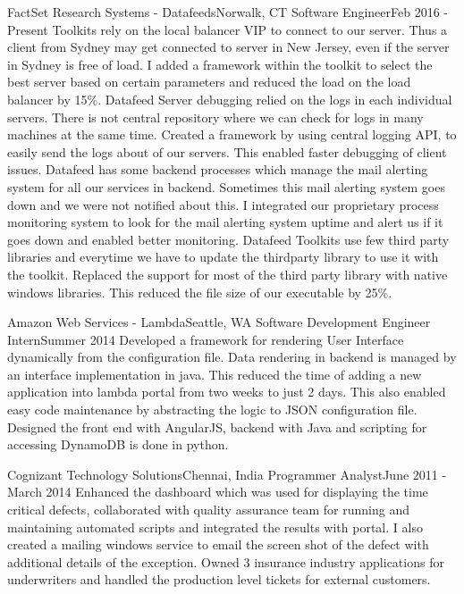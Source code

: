     \resumeSubheading
      {FactSet Research Systems - Datafeeds}{Norwalk, CT}
      {Software Engineer}{Feb 2016 - Present}
      \resumeItemListStart
          {Toolkits rely on the local balancer VIP to connect to our server. Thus a client from Sydney may get connected to server in New Jersey, even if the server in Sydney is free of load. I added a framework within the toolkit to select the best server based on certain parameters and reduced the load on the load balancer by 15\%.}
          {Datafeed Server debugging relied on the logs in each individual servers. There is not central repository where we can check for logs in many machines at the same time. Created a framework by using central logging API, to easily send the logs about of our servers. This enabled faster debugging of client issues. }
          {Datafeed has some backend processes which manage the mail alerting system for all our services in backend. Sometimes this mail alerting system goes down and we were not notified about this. I integrated our proprietary process monitoring system to look for the mail alerting system uptime and alert us if it goes down and enabled better monitoring. }
          {Datafeed Toolkits use few third party libraries and everytime we have to update the thirdparty library to use it with the toolkit. Replaced the support for most of the third party library with native windows libraries. This reduced the file size of our executable by 25\%.}
      \resumeItemListEnd

    \resumeSubheading
      {Amazon Web Services - Lambda}{Seattle, WA}
      {Software Development Engineer Intern}{Summer 2014}
      \resumeItemListStart
          {Developed a framework for rendering User Interface dynamically from the configuration file. Data rendering in backend is managed by an interface implementation in java. This reduced the time of adding a new application into lambda portal from two weeks to just 2 days. This also enabled easy code maintenance by abstracting the logic to JSON configuration file. Designed the front end with AngularJS, backend with Java and scripting for accessing DynamoDB is done in python. }
      \resumeItemListEnd

    \resumeSubheading
      {Cognizant Technology Solutions}{Chennai, India}
      {Programmer Analyst}{June 2011 - March 2014}
      \resumeItemListStart
          {Enhanced the dashboard which was used for displaying the time critical defects, collaborated with quality assurance team for running and maintaining automated scripts and integrated the results with portal. I also created a mailing windows service to email the screen shot of the defect with additional details of the exception.}
          {Owned 3 insurance industry applications for underwriters and handled the production level tickets for external customers.}
      \resumeItemListEnd

